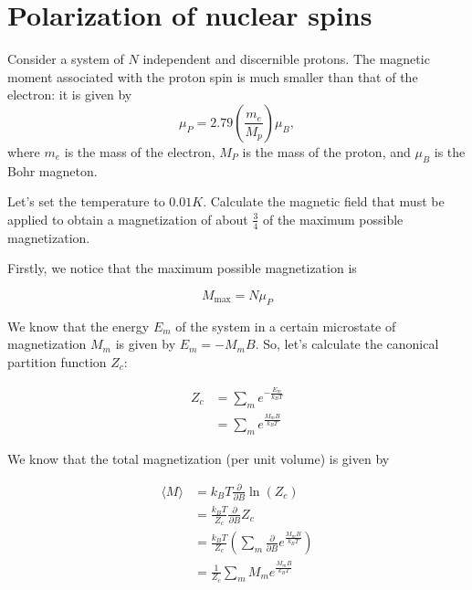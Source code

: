 \documentclass[english]{article}
\begin{document}
	\section{Polarization of nuclear spins}
	\begin{tcolorbox}[colback=blue!5!white,colframe=blue!75!black]
		\quad Consider a system of $N$ independent and discernible protons. The magnetic moment associated with the proton spin is much smaller than that of the electron: it is given by $$\mu_P = 2.79\left(\frac{m_e}{M_p}\right)\mu_B,$$ where $m_e$ is the mass of the electron, $M_P$ is the mass of the proton, and $\mu_B$ is the Bohr magneton.
		
		\quad Let's set the temperature to $0.01K$. Calculate the magnetic field that must be applied to obtain a magnetization of about $\frac{3}{4}$ of the maximum possible magnetization.
	\end{tcolorbox}
	
	Firstly, we notice that the maximum possible magnetization is 
	
	$$ M_{\text{max}} = N\mu_P $$
	
	We know that the energy \(E_m\) of the system in a certain microstate of magnetization \(M_m\) is given by \(E_m = - M_m B\). So, let's calculate the canonical partition function \(Z_c\):
	
	\begin{align}
	Z_c &= \sum_{m} e^{-\frac{E_m}{k_B T}} \\
	&= \sum_{m} e^{\frac{M_m B}{k_B T}}
	\end{align}
	
	We know that the total magnetization (per unit volume) is given by
	
	\begin{align}
	\langle M \rangle &= k_B T \frac{\partial}{\partial B} \ln(Z_c) \\
	&= \frac{k_B T}{Z_c} \frac{\partial}{\partial B} Z_c \\
	&= \frac{k_B T}{Z_c} \left( \sum_{m} \frac{\partial}{\partial B}  e^{\frac{M_m B}{k_B T}} \right) \\
	&= \frac{1}{Z_c} \sum_{m} M_m e^{\frac{M_m B}{k_B T}}
	\end{align}
	
\end{document}
